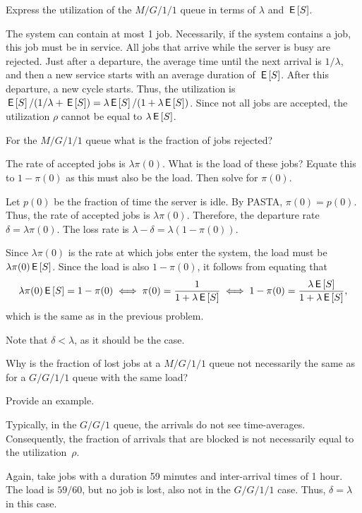 \begin{extra}
  Express the utilization of the $M/G/1/1$ queue in terms of $\lambda$ and $\,\mathsf{E}\left[S\right]$.
\begin{solution}
    The system can contain at most 1 job.
    Necessarily, if the system contains a job, this job must be in service.
    All jobs that arrive while the server is busy are rejected.
    Just after a departure, the average time until the next arrival is $1/\lambda$, and then a new service starts with an average duration of $\,\mathsf{E}\left[S\right]$.
    After this departure, a new cycle starts.
    Thus, the utilization is $\,\mathsf{E}\left[S\right]/(1/\lambda + \,\mathsf{E}\left[S\right]) = \lambda \,\mathsf{E}\left[S\right]/ (1 + \lambda \,\mathsf{E}\left[S\right])$.
    Since not all jobs are accepted, the utilization $\rho$ cannot be equal to $\lambda \,\mathsf{E}\left[S\right]$.
\end{solution}
\end{extra}

\begin{extra}
  For the $M/G/1/1$ queue what is the fraction of jobs rejected?
\begin{hint}
    The rate of accepted jobs is $\lambda \pi(0)$.
    What is the load of these jobs?
    Equate this to $1-\pi(0)$ as this must also be the load.
    Then solve for $\pi(0)$.
\end{hint}
\begin{solution}
    Let $p(0)$ be the fraction of time the server is idle. By PASTA,
    $\pi(0)=p(0)$. Thus, the rate of accepted jobs is
    $\lambda\pi(0)$. Therefore, the departure rate
    $\delta=\lambda\pi(0)$. The loss rate is
    $\lambda-\delta = \lambda (1-\pi(0))$.

    Since $\lambda\pi(0)$ is the rate at which jobs enter the system,
    the load must be $\lambda\pi(0)\,\mathsf{E}\left[S\right]$. Since the load is also
    $1-\pi(0)$, it follows from equating that
    \begin{equation*}
      \lambda\pi(0) \,\mathsf{E}\left[S\right] = 1 - \pi(0) \iff \pi(0)=\frac1{1+\lambda\,\mathsf{E}\left[S\right]} 
\iff 1-\pi(0) = \frac{\lambda \,\mathsf{E}\left[S\right]}{1+\lambda \,\mathsf{E}\left[S\right]},
    \end{equation*}
which is the same as in the previous problem.

Note that  $\delta < \lambda$, as it should be the case. 
\end{solution}
\end{extra}


\begin{extra}
  Why is the fraction of lost jobs at a $M/G/1/1$ queue not necessarily the same as for a $G/G/1/1$ queue with the same load?
\begin{hint}
Provide an  example.
\end{hint}
\begin{solution}
 Typically, in the $G/G/1$ queue, the arrivals do not see  time-averages. Consequently, the fraction of arrivals that are blocked is not necessarily equal to the utilization~$\rho$.

  Again, take jobs with a duration 59 minutes and inter-arrival times of
  1 hour. The load is $59/60$, but no job is lost, also not in the
  $G/G/1/1$ case. Thus, $\delta=\lambda$ in this case.
\end{solution}
\end{extra}



